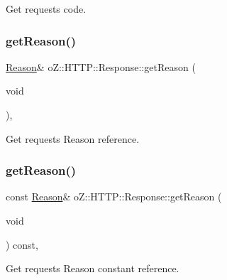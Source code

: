 Get request\textquotesingle{}s code. 

\mbox{\label{classo_z_1_1_h_t_t_p_1_1_response_a72ccc6e4aa64f1bf2c54218436631a26}} 
\subsubsection{\texorpdfstring{getReason()}{getReason()}\hspace{0.1cm}{\footnotesize\ttfamily [1/2]}}
{\footnotesize\ttfamily \mbox{\hyperlink{namespaceo_z_1_1_h_t_t_p_afcd8b91e5e8a7b6df0a7b3b298ec3965}{Reason}}\& o\+Z\+::\+H\+T\+T\+P\+::\+Response\+::get\+Reason (\begin{DoxyParamCaption}\item[{void}]{ }\end{DoxyParamCaption})\hspace{0.3cm}{\ttfamily [inline]}, {\ttfamily [noexcept]}}



Get request\textquotesingle{}s Reason reference. 

\mbox{\label{classo_z_1_1_h_t_t_p_1_1_response_a9b05303e7b76a04d3ab4ed8960de130c}} 
\subsubsection{\texorpdfstring{getReason()}{getReason()}\hspace{0.1cm}{\footnotesize\ttfamily [2/2]}}
{\footnotesize\ttfamily const \mbox{\hyperlink{namespaceo_z_1_1_h_t_t_p_afcd8b91e5e8a7b6df0a7b3b298ec3965}{Reason}}\& o\+Z\+::\+H\+T\+T\+P\+::\+Response\+::get\+Reason (\begin{DoxyParamCaption}\item[{void}]{ }\end{DoxyParamCaption}) const\hspace{0.3cm}{\ttfamily [inline]}, {\ttfamily [noexcept]}}



Get request\textquotesingle{}s Reason constant reference. 

\mbox{\label{classo_z_1_1_h_t_t_p_1_1_response_a37a97a943ebded8fca87ee14cd76c0fa}} 
